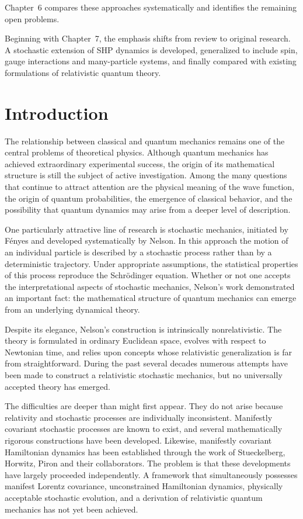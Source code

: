 Chapter~6 compares these approaches systematically and identifies the
remaining open problems.

Beginning with Chapter~7, the emphasis shifts from review to original
research. A stochastic extension of SHP dynamics is developed,
generalized to include spin, gauge interactions and many-particle
systems, and finally compared with existing formulations of relativistic
quantum theory.

\section{Introduction}

The relationship between classical and quantum mechanics remains one of
the central problems of theoretical physics. Although quantum mechanics
has achieved extraordinary experimental success, the origin of its
mathematical structure is still the subject of active investigation.
Among the many questions that continue to attract attention are the
physical meaning of the wave function, the origin of quantum
probabilities, the emergence of classical behavior, and the possibility
that quantum dynamics may arise from a deeper level of description.

One particularly attractive line of research is stochastic mechanics,
initiated by Fényes and developed systematically by Nelson. In this
approach the motion of an individual particle is described by a
stochastic process rather than by a deterministic trajectory. Under
appropriate assumptions, the statistical properties of this process
reproduce the Schrödinger equation. Whether or not one accepts the
interpretational aspects of stochastic mechanics, Nelson's work
demonstrated an important fact: the mathematical structure of quantum
mechanics can emerge from an underlying dynamical theory.

Despite its elegance, Nelson's construction is intrinsically
nonrelativistic. The theory is formulated in ordinary Euclidean space,
evolves with respect to Newtonian time, and relies upon concepts whose
relativistic generalization is far from straightforward. During the past
several decades numerous attempts have been made to construct a
relativistic stochastic mechanics, but no universally accepted theory
has emerged.

The difficulties are deeper than might first appear. They do not arise
because relativity and stochastic processes are individually
inconsistent. Manifestly covariant stochastic processes are known to
exist, and several mathematically rigorous constructions have been
developed. Likewise, manifestly covariant Hamiltonian dynamics has been
established through the work of Stueckelberg, Horwitz, Piron and their
collaborators. The problem is that these developments have largely
proceeded independently. A framework that simultaneously possesses
manifest Lorentz covariance, unconstrained Hamiltonian dynamics,
physically acceptable stochastic evolution, and a derivation of
relativistic quantum mechanics has not yet been achieved.

